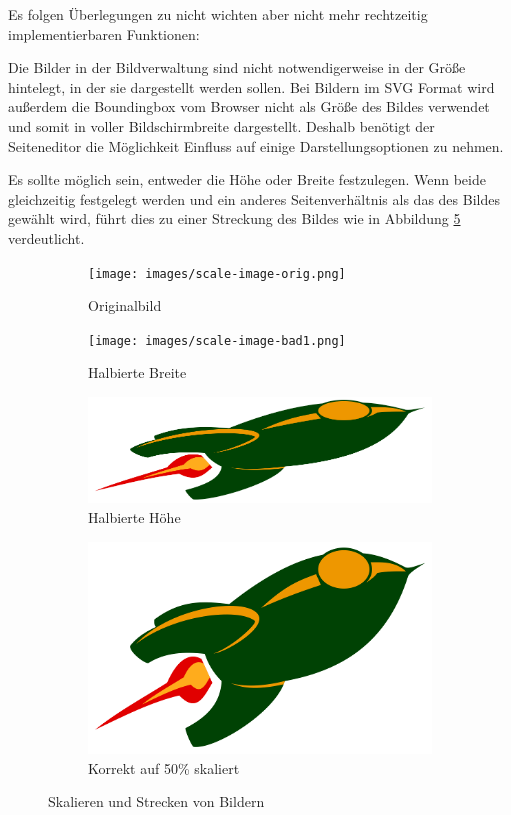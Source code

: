 Es folgen Überlegungen zu nicht wichten aber nicht mehr rechtzeitig
implementierbaren Funktionen:

Die Bilder in der Bildverwaltung sind nicht notwendigerweise in der Größe
hintelegt, in der sie dargestellt werden sollen. Bei Bildern im SVG Format
wird außerdem die Boundingbox vom Browser nicht als Größe des Bildes verwendet
und somit in voller Bildschirmbreite dargestellt. Deshalb benötigt der
Seiteneditor die Möglichkeit Einfluss auf einige Darstellungsoptionen zu nehmen.

Es sollte möglich sein, entweder die Höhe oder Breite festzulegen. Wenn beide
gleichzeitig festgelegt werden und ein anderes Seitenverhältnis als das des
Bildes gewählt wird, führt dies zu einer Streckung des Bildes wie in Abbildung
\ref{fig:scaling-overview} verdeutlicht.

\begin{figure}
  \begin{subfigure}[b]{0.66\columnwidth}
    \texttt{[image: images/scale-image-orig.png]}
    \caption{Originalbild}
    \label{fig:scaling-original}
  \end{subfigure}
  \begin{subfigure}[b]{0.33\columnwidth}
    \texttt{[image: images/scale-image-bad1.png]}
    \caption{Halbierte Breite}
    \label{fig:scaling-bad1}
  \end{subfigure}
  \begin{subfigure}[b]{0.66\columnwidth}
    \includegraphics[width=\columnwidth]{images/scale-image-bad2.png}
    \caption{Halbierte Höhe}
    \label{fig:scaling-bad2}
  \end{subfigure}
  \begin{subfigure}[b]{0.33\columnwidth}
    \includegraphics[width=\columnwidth]{images/scale-image-good.png}
    \caption{Korrekt auf 50\% skaliert}
    \label{fig:scaling-good}
  \end{subfigure}
  \caption{Skalieren und Strecken von Bildern}
  \label{fig:scaling-overview}
\end{figure}

